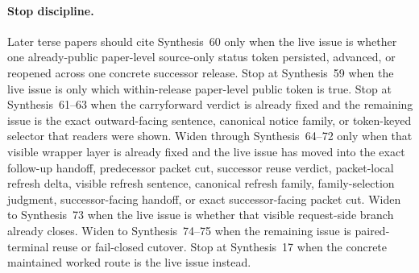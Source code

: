 \documentclass[11pt]{article}
\begin{document}
\paragraph{Stop discipline.}
Later terse papers should cite Synthesis~60 only when the live issue is whether one already-public paper-level source-only status token persisted, advanced, or reopened across one concrete successor release.
Stop at Synthesis~59 when the live issue is only which within-release paper-level public token is true.
Stop at Synthesis~61--63 when the carryforward verdict is already fixed and the remaining issue is the exact outward-facing sentence, canonical notice family, or token-keyed selector that readers were shown.
Widen through Synthesis~64--72 only when that visible wrapper layer is already fixed and the live issue has moved into the exact follow-up handoff, predecessor packet cut, successor reuse verdict, packet-local refresh delta, visible refresh sentence, canonical refresh family, family-selection judgment, successor-facing handoff, or exact successor-facing packet cut.
Widen to Synthesis~73 when the live issue is whether that visible request-side branch already closes.
Widen to Synthesis~74--75 when the remaining issue is paired-terminal reuse or fail-closed cutover.
Stop at Synthesis~17 when the concrete maintained worked route is the live issue instead.\cite{series:publicrequestresponsemenus,series:publicrequestresponsepackets,series:publicrequestresponsepacketsuccessorcarryforward,series:publicrequestresponsepacketdeltaledgers,series:publicrequestresponsepacketrefreshnotices,series:publicrequestresponsepacketrefreshnormalforms,series:publicrequestresponsepacketrefreshselections,series:publicrequestresponsepacketrefreshresponsemenus,series:publicrequestresponsepacketrefreshresponsepackets,series:publicrequestresponsepacketrefreshresponsepacketclosureverdicts,series:pairedterminalcitationdiscipline,series:pairedterminalcutoverrule}
\end{document}
